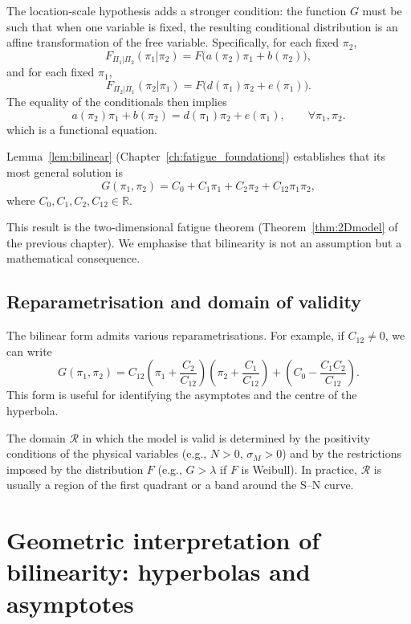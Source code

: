 The location-scale hypothesis adds a stronger condition: the function \(G\) must be such that when one variable is fixed, the resulting conditional distribution is an affine transformation of the free variable. Specifically, for each fixed \(\pi_2\),
\[
F_{\Pi_1|\Pi_2}(\pi_1|\pi_2) = F\bigl(a(\pi_2)\pi_1 + b(\pi_2)\bigr),
\]
and for each fixed \(\pi_1\),
\[
F_{\Pi_2|\Pi_1}(\pi_2|\pi_1) = F\bigl(d(\pi_1)\pi_2 + e(\pi_1)\bigr).
\]
The equality of the conditionals then implies
\begin{equation}
a(\pi_2)\pi_1 + b(\pi_2) = d(\pi_1)\pi_2 + e(\pi_1), \qquad \forall \pi_1,\pi_2.
\label{eq:functional-2D}
\end{equation}
which is a functional equation.

Lemma~\ref{lem:bilinear} (Chapter~\ref{ch:fatigue_foundations}) establishes that its most general solution is
\begin{equation}
\boxed{
G(\pi_1,\pi_2) = C_0 + C_1\pi_1 + C_2\pi_2 + C_{12}\pi_1\pi_2,
}
\label{eq:bilinear-solution}
\end{equation}
where \(C_0,C_1,C_2,C_{12}\in\mathbb{R}\).

This result is the two-dimensional fatigue theorem (Theorem~\ref{thm:2Dmodel} of the previous chapter). We emphasise that bilinearity is not an assumption but a mathematical consequence.

\subsection{Reparametrisation and domain of validity}

The bilinear form admits various reparametrisations. For example, if \(C_{12}\neq0\), we can write
\[
G(\pi_1,\pi_2) = C_{12}\left(\pi_1 + \frac{C_2}{C_{12}}\right)\left(\pi_2 + \frac{C_1}{C_{12}}\right) + \left(C_0 - \frac{C_1C_2}{C_{12}}\right).
\]
This form is useful for identifying the asymptotes and the centre of the hyperbola.

The domain \(\mathcal{R}\) in which the model is valid is determined by the positivity conditions of the physical variables (e.g., \(N>0\), \(\sigma_M>0\)) and by the restrictions imposed by the distribution \(F\) (e.g., \(G>\lambda\) if \(F\) is Weibull). In practice, \(\mathcal{R}\) is usually a region of the first quadrant or a band around the S–N curve.

\section{Geometric interpretation of bilinearity: hyperbolas and asymptotes}
\label{sec:geometric-bilinear}


